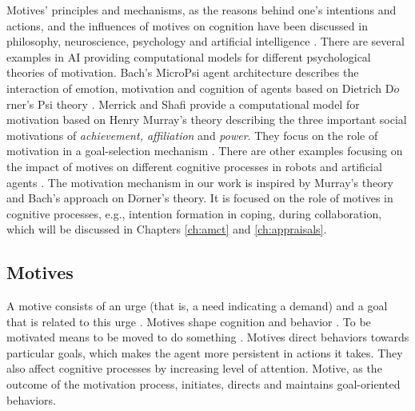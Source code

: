 \documentclass[12pt]{report}
\begin{document}
Motives' principles and mechanisms, as the reasons behind one's intentions and
actions, and the influences of motives on cognition have been discussed in
philosophy, neuroscience, psychology and artificial intelligence
\cite{bach:motivaitional-system-ai, berridge:motivation-concepts-neuroscience,
brody:motivation-goal-action, simon:motivation-emotion-cognition,
sloman:motivation}. There are several examples in AI providing computational
models for different psychological theories of motivation. Bach's MicroPsi agent
architecture describes the interaction of emotion, motivation and cognition of
agents based on Dietrich D$\ddot{o}$rner's Psi theory
\cite{bach:micropsi-agent-architecture, bach:psi, bach:motivaitional-system-ai,
bach:next-generation-micropsi}. Merrick and Shafi provide a computational
model for motivation based on Henry Murray's theory
\cite{murray:personality-exploration} describing the three important social
motivations of \textit{achievement, affiliation} and \textit{power}. They focus
on the role of motivation in a goal-selection mechanism
\cite{merrick:acheievement-affiliation-power}. There are other examples focusing
on the impact of motives on different cognitive processes in robots and
artificial agents \cite{breazeal:motivation-regulating-hri,
dolores:socially-emotional, deSevin:motivational-model-agent,
sellers:comprehensive-emotion-theory, velasquez:emotions-motivations-agents,
wright:implementation-agent-architecture}. The motivation mechanism in our work
is inspired by Murray's theory and Bach's approach on D$\ddot{o}$rner's theory.
It is focused on the role of motives in cognitive processes, e.g.,
intention formation in coping, during collaboration, which will be discussed in
Chapters \ref{ch:amct} and \ref{ch:appraisals}.

\subsection{Motives}

A motive consists of an urge (that is, a need indicating a demand) and a goal
that is related to this urge \cite{bach:psi}. Motives shape cognition and
behavior \cite{schultheiss:implicit-motive}. To be motivated means to be moved
to do something \cite{ryan:intrinsic-extrinsic-motivations}. Motives direct
behaviors towards particular goals, which makes the agent more persistent in
actions it takes. They also affect cognitive processes by increasing level of
attention. Motive, as the outcome of the motivation process, initiates, directs
and maintains goal-oriented behaviors.
\end{document}
